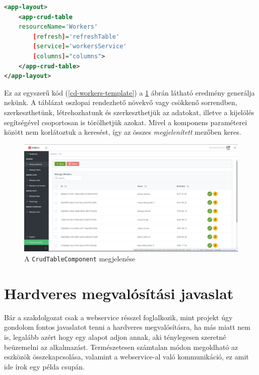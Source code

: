 \documentclass[a4paper,12pt]{thesis-ekf}
\theoremstyle{definition}
\begin{document}
		    	\begin{lstlisting}[caption={\texttt{workers.component.html}},captionpos=b,language=xml,label=cd-workers-template]
<app-layout>
    <app-crud-table 
    resourceName='Workers' 
        [refresh]='refreshTable' 
        [service]='workersService' 
        [columns]="columns">
    </app-crud-table>
</app-layout>
			\end{lstlisting}
			
			Ez az egyszerű kód (\ref{cd-workers-template}) a \ref{fig-coreui-workers} ábrán látható eredmény generálja nekünk. A táblázat oszlopai rendezhető növekvő vagy csökkenő sorrendben, szerkeszthetünk, létrehozhatunk és szerkeszthetjük az adatokat, illetve a kijelölés segítségével csoportosan is törölhetjük azokat. Mivel a komponens paraméterei között nem korlátoztuk a keresést, így az összes \emph{megjelenített} mezőben keres.
			
			\begin{figure}[ht]
            	\centering
            	\includegraphics[width=1\textwidth]{images/coreui-workers.png}
            	\caption{A \texttt{CrudTableComponent} megjelenése}
            	\label{fig-coreui-workers}
            \end{figure}
		    
    		
		
    		
	\chapter{Hardveres megvalósítási javaslat}\label{ch-Hardware}
		Bár a szakdolgozat csak a webservice résszel foglalkozik, mint projekt úgy gondolom fontos javaslatot tenni a hardveres megvalósításra, ha más miatt nem is, legalább azért hogy egy alapot adjon annak, aki ténylegesen szeretné beüzemelni az alkalmazást. Természetesen számtalan módon megoldható az eszközök összekapcsolása, valamint a webservice-al való kommunikáció, ez amit ide írok egy példa csupán.
		
\end{document}
